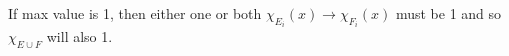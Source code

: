 \documentclass[preview]{standalone}
\begin{document}
\begin{center}
If max value is 1, then either one or both $\chi_{E_i}(x) \to \chi_{F_i}(x)$ must be 1 and so $\chi_{E \cup F}$ will also 1.
\end{center}
\end{document}
